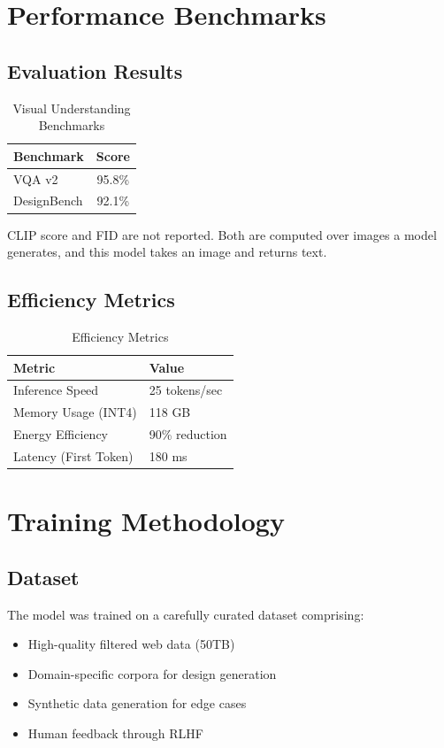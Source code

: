 \documentclass[11pt,a4paper]{article}
\begin{document}
\section{Performance Benchmarks}

\subsection{Evaluation Results}

\begin{table}[H]
\centering
\begin{tabular}{lc}
\toprule
\textbf{Benchmark} & \textbf{Score} \\
\midrule
VQA v2 & 95.8\% \\
DesignBench & 92.1\% \\
\bottomrule
\end{tabular}
\caption{Visual Understanding Benchmarks}
\end{table}

CLIP score and FID are not reported. Both are computed over images a model
generates, and this model takes an image and returns text.

\subsection{Efficiency Metrics}

\begin{table}[H]
\centering
\begin{tabular}{ll}
\toprule
\textbf{Metric} & \textbf{Value} \\
\midrule
Inference Speed & 25 tokens/sec \\
Memory Usage (INT4) & 118 GB \\
Energy Efficiency & 90\% reduction \\
Latency (First Token) & 180 ms \\
\bottomrule
\end{tabular}
\caption{Efficiency Metrics}
\end{table}

\section{Training Methodology}

\subsection{Dataset}
The model was trained on a carefully curated dataset comprising:
\begin{itemize}
    \item High-quality filtered web data (50TB)
    \item Domain-specific corpora for design generation
    \item Synthetic data generation for edge cases
    \item Human feedback through RLHF
\end{itemize}
\end{document}
